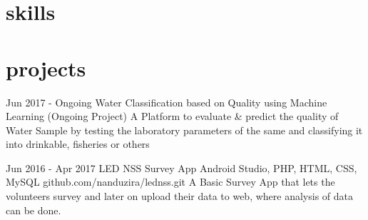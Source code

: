 \documentclass[]{friggeri-cv}
\begin{document}
\section{skills}
\begin{entrylist}
\end{entrylist}
\newline

\section{projects}
\begin{entrylist}
	
	\entry
	{Jun 2017 - Ongoing}
	{Water Classification based on Quality using Machine Learning {\normalfont (Ongoing Project)}}
	{}
	{A Platform to evaluate \& predict the quality of Water Sample by testing the laboratory parameters of the same and classifying it into drinkable, fisheries or others}
	  
	
	\entry
	{Jun 2016 - Apr 2017}
	{LED NSS Survey App {\normalfont Android Studio, PHP, HTML, CSS, MySQL}}
	{github.com/nanduzira/lednss.git}
	{A Basic Survey App that let\textquotesingle{}s the volunteers survey and later on upload their data to web, where analysis of data can be done.}
	  
\end{entrylist}
\newline
\end{document}
